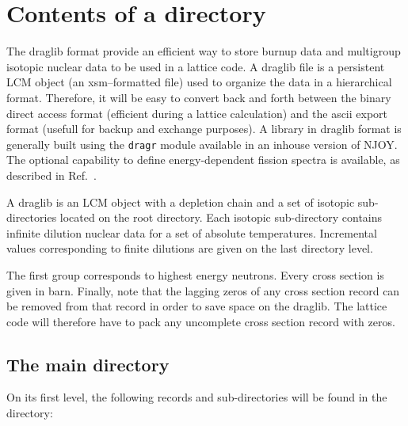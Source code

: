 \section{Contents of a  directory}\label{sect:draglibdir}

The {\sc draglib} format provide an efficient way to store burnup data and multigroup isotopic nuclear
data to be used in a lattice code. A {\sc draglib} file is a persistent
LCM object (an {\sc xsm}--formatted file) used to organize the
data in a hierarchical format. Therefore, it will be easy to convert back and
forth between the binary direct access format (efficient during a lattice
calculation) and the {\sc ascii} export format (usefull for backup and exchange purposes).
A library in {\sc draglib} format is generally built using the {\tt dragr} module
available in an inhouse version of NJOY.\cite{Dragr} The optional capability to define energy-dependent
fission spectra is available, as described in Ref.~.

\vskip0.2cm

A {\sc draglib} is an LCM object with a depletion chain and a set of isotopic
sub-directories located on the root directory. Each isotopic sub-directory
contains infinite dilution nuclear data for a set of absolute temperatures.
Incremental values corresponding to finite dilutions are given on the last
directory level.

\vskip0.2cm

The first group corresponds to highest energy neutrons.
Every cross section is given in barn. Finally, note that the lagging zeros of
any cross section record can be removed from that record in order to save space
on the {\sc draglib}. The lattice code will therefore have to pack any uncomplete
cross section record with zeros.

\subsection{The main  directory}\label{sect:drglibdirmain}

On its first level, the
following records and sub-directories will be found in the  directory:

